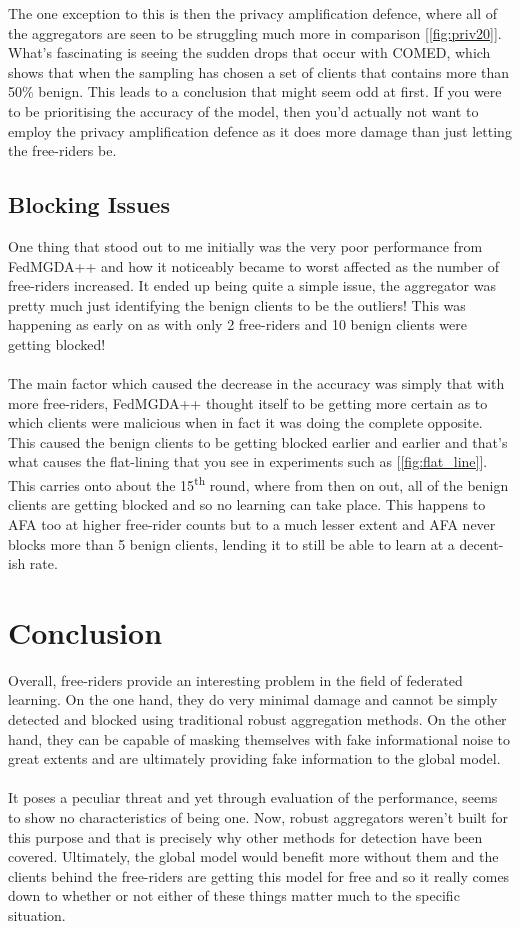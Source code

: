 The one exception to this is then the privacy amplification defence, where all of the aggregators are seen to be struggling much more in comparison [\ref{fig:priv20}].
What's fascinating is seeing the sudden drops that occur with COMED, which shows that when the sampling has chosen a set of clients that contains more than 50\% benign.
This leads to a conclusion that might seem odd at first.
If you were to be prioritising the accuracy of the model, then you'd actually not want to employ the privacy amplification defence as it does more damage than just letting the free-riders be.

\subsection{Blocking Issues}
One thing that stood out to me initially was the very poor performance from FedMGDA++ and how it noticeably became to worst affected as the number of free-riders increased.
It ended up being quite a simple issue, the aggregator was pretty much just identifying the benign clients to be the outliers!
This was happening as early on as with only 2 free-riders and 10 benign clients were getting blocked!
\\ \\
The main factor which caused the decrease in the accuracy was simply that with more free-riders, FedMGDA++ thought itself to be getting more certain as to which clients were malicious when in fact it was doing the complete opposite.
This caused the benign clients to be getting blocked earlier and earlier and that's what causes the flat-lining that you see in experiments such as [\ref{fig:flat_line}].
This carries onto about the 15\textsuperscript{th} round, where from then on out, all of the benign clients are getting blocked and so no learning can take place.
This happens to AFA too at higher free-rider counts but to a much lesser extent and AFA never blocks more than 5 benign clients, lending it to still be able to learn at a decent-ish rate.


\section{Conclusion}
Overall, free-riders provide an interesting problem in the field of federated learning.
On the one hand, they do very minimal damage and cannot be simply detected and blocked using traditional robust aggregation methods.
On the other hand, they can be capable of masking themselves with fake informational noise to great extents and are ultimately providing fake information to the global model.
\\ \\
It poses a peculiar threat and yet through evaluation of the performance, seems to show no characteristics of being one.
Now, robust aggregators weren't built for this purpose and that is precisely why other methods for detection have been covered.
Ultimately, the global model would benefit more without them and the clients behind the free-riders are getting this model for free and so it really comes down to whether or not either of these things matter much to the specific situation.
